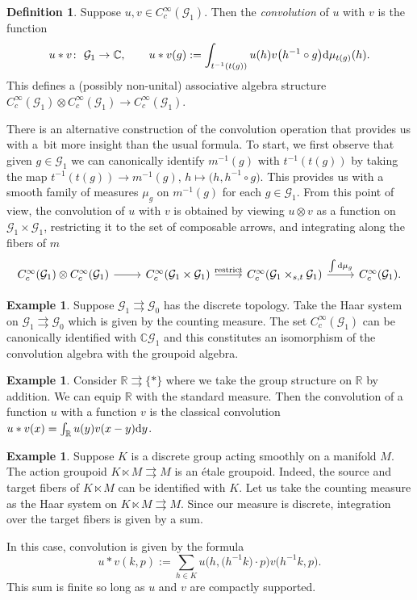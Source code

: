 \documentclass[pdftex]{sigma}
\numberwithin{equation}{section}
\theoremstyle{definition}
\newtheorem{Definition}[Theorem]{Definition}
\newtheorem{Example}[Theorem]{Example}
\newcommand{\BBR}{\mathbb{R}}
\newcommand{\BBC}{\mathbb{C}}
\newcommand{\CG}{\mathcal{G}}
\newcommand{\inv}{^{-1}}
\newcommand{\grpd}{\rightrightarrows}
\begin{document}
\begin{Definition}
  Suppose $ u, v \in C_c^\infty(\CG_1) $. Then the \emph{convolution} of $ u $ with $ v $ is the function
  \[
  u * v \colon\ \CG_1 \to \BBC, \qquad u*v(g) := \int_{t\inv(t(g))} u(h) v\big(h\inv \circ g\big) {\rm d} \mu_{t(g)}(h).
  \]
  This defines a (possibly non-unital) associative algebra structure
  $C_c^\infty(\CG_1 ) \otimes C_c^\infty(\CG_1) \to C_c^\infty(\CG_1)$.
\end{Definition}
There is an alternative construction of the convolution operation that provides us with a~bit more insight than the usual formula. To start, we first observe that given $ g \in \CG_1 $ we can canonically identify $ m\inv(g)$ with $ t\inv(t(g)) $ by taking the map
$t\inv(t(g)) \to m\inv(g)$, ${h \mapsto \big(h, h\inv \circ g \big)}$.
This provides us with a smooth family of measures $ \mu_g $ on $ m\inv(g) $ for each $ g \in \CG_1 $. From this point of view, the convolution of $ u $ with $ v $ is obtained by viewing $ u \otimes v $ as a function on $ \CG_1 \times \CG_1 $, restricting it to the set of composable arrows, and integrating along the fibers of $ m $
\[\begin{tikzcd}
C_c^\infty(\CG_1 ) \otimes C_c^\infty(\CG_1) \arrow[r]& C_c^\infty(\CG_1 \times \CG_1) \arrow[r, "\text{restrict}"] & C_c^\infty( \CG_1 \times_{s,t} \CG_1) \arrow[r, "{\int {\rm d} \mu_g}"] & C_c^\infty(\CG_1).
\end{tikzcd}
\]
\begin{Example}\label{example:category.algebra.convolution}
   Suppose $ \CG_1 \grpd \CG_0 $ has the discrete topology. Take the Haar system on $ \CG_1 \grpd \CG_0 $ which is given by the counting measure. The set $ C_c^\infty(\CG_1)$ can be canonically identified with $ \BBC \CG_1 $ and this constitutes an isomorphism of the convolution algebra with the groupoid algebra.
\end{Example}
\begin{Example}
   Consider $ \BBR \grpd \{ * \} $ where we take the group structure on $ \BBR $ by addition. We can equip $ \BBR $ with the standard measure. Then the convolution of a function $ u $ with a function $ v $ is the classical convolution
  $u * v (x) = \int_{\BBR} u(y) v(x-y) {\rm d}y $.
\end{Example}

\begin{Example}
   Suppose $ K $ is a discrete group acting smoothly on a manifold $ M $. The action groupoid $ K \ltimes M \grpd M $ is an \'etale groupoid. Indeed, the source and target fibers of $ K \ltimes M $ can be identified with $ K $. Let us take the counting measure as the Haar system on $ K \ltimes M \grpd M $. Since our measure is discrete, integration over the target fibers is given by a sum.

  In this case, convolution is given by the formula
  \[ u * v (k,p) := \sum_{h \in K } u\big(h, \big(h\inv k\big) \cdot p \big) v\big(h\inv k, p\big).
   \]
  This sum is finite so long as $ u $ and $ v $ are compactly supported.
\end{Example}
\end{document}
